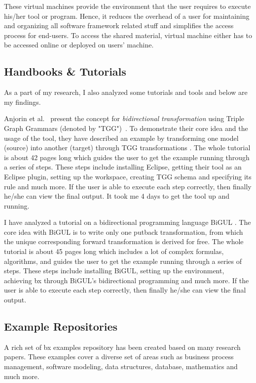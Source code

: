 These virtual machines provide the environment that the user requires to execute his/her tool or program. Hence, it reduces the overhead of a user for maintaining and organizing all software framework related stuff and simplifies the access process for end-users. To access the shared material, virtual machine either has to be accessed online or deployed on users' machine.

\subsection{Handbooks \& Tutorials}\label{subsec:handbook}
As a part of my research, I also analyzed some tutorials and tools and below are my findings.

Anjorin et al.~\cite{emoflon-part4} present the concept for \textit{bidirectional transformation} using Triple Graph Grammars (denoted by "TGG")~\cite{tgg}. To demonstrate their core idea and the usage of the tool, they have described an example by transforming one model (source) into another (target) through TGG transformations \cite{tgg}\cite{bx-tgg}. The whole tutorial is about 42 pages long which guides the user to get the example running through a series of steps. These steps include installing \ac{Eclipse}, getting their tool as an Eclipse plugin, setting up the workspace, creating TGG schema and specifying its rule and much more. If the user is able to execute each step correctly, then finally he/she can view the final output. It took me 4 days to get the tool up and running.

I have analyzed a tutorial \cite{bigul-tutorial} on a bidirectional programming language BiGUL \cite{bigul}. The core idea with BiGUL is to write only one putback transformation, from which the unique corresponding forward transformation is derived for free. The whole tutorial is about 45 pages long which includes a lot of complex formulas, algorithms, and guides the user to get the example running through a series of steps. These steps include installing BiGUL, setting up the environment, achieving bx through BiGUL's bidirectional programming and much more. If the user is able to execute each step correctly, then finally he/she can view the final output. 

\subsection{Example Repositories}\label{subsec:examplerep}
A rich set of bx examples repository \cite{bx-examples} has been created based on many research papers. These examples cover a diverse set of areas such as business process management, software modeling, data structures, database, mathematics and much more.

